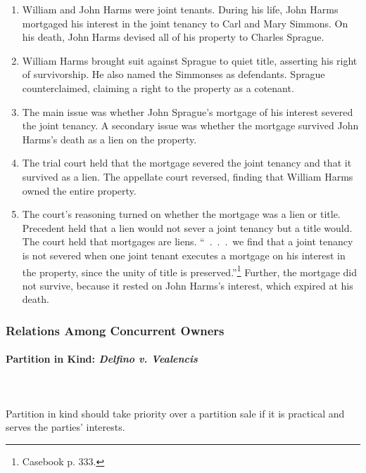 \begin{enumerate}
    \item William and John Harms were joint tenants. During his life, John 
    Harms mortgaged his interest in the joint tenancy to Carl and Mary 
    Simmons. On his death, John Harms devised all of his property to Charles 
    Sprague.
    \item William Harms brought suit against Sprague to quiet title, asserting 
    his right of survivorship. He also named the Simmonses as defendants. 
    Sprague counterclaimed, claiming a right to the property as a cotenant.
    \item The main issue was whether John Sprague's mortgage of his interest 
    severed the joint tenancy. A secondary issue was whether the mortgage 
    survived John Harms's death as a lien on the property.
    \item The trial court held that the mortgage severed the joint tenancy and 
    that it survived as a lien. The appellate court reversed, finding that 
    William Harms owned the entire property.
    \item The court's reasoning turned on whether the mortgage was a lien or 
    title. Precedent held that a lien would not sever a joint tenancy but a 
    title would. The court held that mortgages are liens. ``~.~.~.~we find 
    that a joint tenancy is not severed when one joint tenant executes a 
    mortgage on his interest in the property, since the unity of title is 
    preserved.''\footnote{Casebook p. 333.} Further, the mortgage did not 
    survive, because it rested on John Harms's interest, which expired at his 
    death.
\end{enumerate}

\subsubsection{Relations Among Concurrent Owners}

\paragraph{Partition in Kind: \emph{Delfino v. Vealencis}}
~\\\\
Partition in kind should take priority over a partition sale if it is 
practical and serves the parties' interests.

